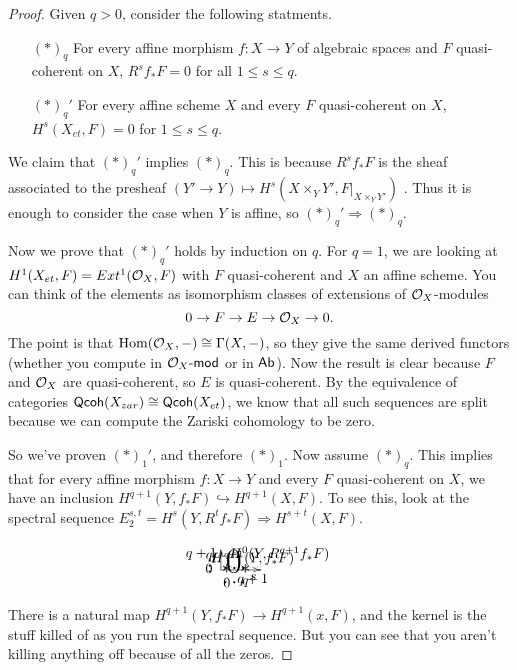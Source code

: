  \begin{proof}
   Given $q>0$, consider the following statments.
   \begin{enumerate}
     \item[$(*)_q$] For every affine morphism $f:X\to Y$ of algebraic spaces and $F$
     quasi-coherent on $X$, $R^s\!f_*F=0$ for all $1\le s\le q$.
     \item[$(*)_q'$] For every affine scheme $X$ and every $F$ quasi-coherent on $X$,
     $H^s(X_{et},F)=0$ for $1\le s\le q$.
   \end{enumerate}
   We claim that $(*)_q'$ implies $(*)_q$. This is because $R^s\!f_*F$ is the sheaf
   associated to the presheaf $(Y'\to Y)\mapsto H^s(X\times_Y Y',F|_{X\times_Y Y'})$
   . Thus it is enough to consider the case when $Y$ is affine, so
   $(*)_q'\Rightarrow (*)_q$.

   Now we prove that $(*)_q'$ holds by induction on $q$. For $q=1$, we are looking at
   $H^1(X_{et},F)=Ext^1(\mathcal{O}_X,F)$ with $F$ quasi-coherent and $X$ an affine scheme. You
   can think of the elements as isomorphism classes of extensions of $\mathcal{O}_X$-modules
   \[
    0\to F\to E\to \mathcal{O}_X\to 0.
   \]
   The point is that $\operatorname{Hom}(\mathcal{O}_X,-)\cong \Gamma(X,-)$, so they give the same derived functors
   (whether you compute in $\mathcal{O}_X\textrm{-\sf mod}$ or in $\text{\sf Ab}$). Now the result is clear because $F$
   and $\mathcal{O}_X$ are quasi-coherent, so $E$ is quasi-coherent. By the equivalence of
   categories $\text{\sf Qcoh}(X_{zar})\cong \text{\sf Qcoh}(X_{et})$, we know that all such sequences are
   split because we can compute the Zariski cohomology to be zero.

   So we've proven $(*)_1'$, and therefore $(*)_1$. Now assume $(*)_q$. This implies that
   for every affine morphism $f:X\to Y$ and every $F$ quasi-coherent on $X$, we have an
   inclusion $H^{q+1}(Y,f_*F)\hookrightarrow H^{q+1}(X,F)$. To see this, look at the
   spectral sequence $E_2^{s,t}=H^s(Y,R^t\!f_*F)\Rightarrow H^{s+t}(X,F)$.
   \[\begin{xy}
     (0,5) *+!UR{t}, (10,0) *+!UR{s},
     (8,0) *+!D{H^{q+1}(Y,f_*F)}, (0,4) *++!L{H^0(Y,R^{q+1}f_*F)},
     (0,3.5); (10,3.5) **@{.}; (6.5,3.5); (6.5,0) **@{.},
     (3.25,2.1) *{\mbox{\Huge 0}},
     (0,.7);(10,.7) **@{.},
     (1.5,.35) *{\mbox{\Large $\ast$}},
     (3.8,.35) *{\mbox{\Large $\cdots$}},
     (6.15,.35) *{\mbox{\Large $\ast$}},
     (0,.35) *++!R{0}, (0,2.1) *++!R{\mbox{\Large $\vdots$}},
     (0,3.2) *++!R{q}, (0,4) *+!R{q+1},
     (1.5,0) *++!U{0}, (3.8,0) *++!U{\mbox{\Large $\cdots$}},
     (6.15,0) *++!U{q}, (8,0) *+!U{q+1},
     \ar 0;(0,5)
     \ar 0;(10,0)
   \end{xy}\]
   There is a natural map $H^{q+1}(Y,f_*F)\to H^{q+1}(x,F)$, and the kernel is the stuff
   killed of as you run the spectral sequence. But you can see that you aren't killing
   anything off because of all the zeros.


\end{proof}
